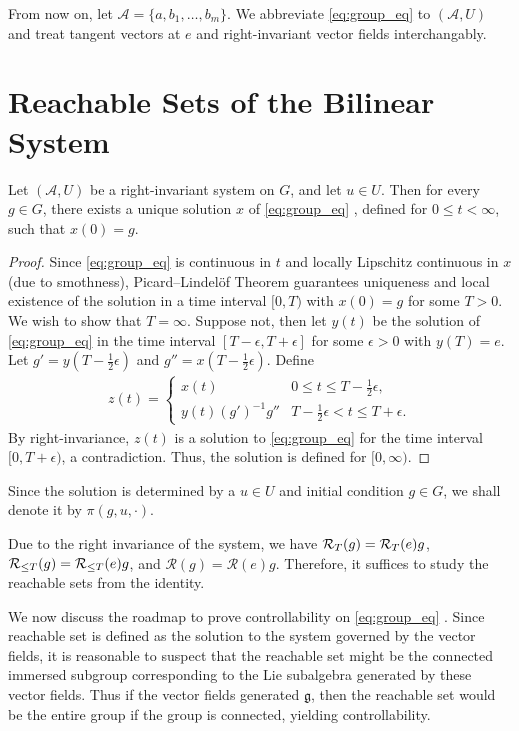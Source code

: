 \documentclass[12pt,class=article,crop=false]{standalone}
\begin{document}
From now on, let $ \mathcal{ A} = \{a,b_1,\ldots,b_m\} $. We abbreviate \cref{eq:group_eq}  to $ ( \mathcal{ A},U)$ and treat tangent vectors at $ e$ and right-invariant vector fields interchangably.

\section{Reachable Sets of the Bilinear System}
\begin{prop}
Let $ ( \mathcal{ A}, U)$ be a right-invariant system on $ G$, and let  $ u \in U$. Then for every $ g \in G$, there exists a unique solution $ x$ of \cref{eq:group_eq} , defined for  $ 0 \leq t < \infty$, such that $ x(0) = g$.
\end{prop}
\begin{proof}
	Since \cref{eq:group_eq}  is continuous in $ t$ and locally Lipschitz continuous in  $ x$ (due to smothness), Picard--Lindel\"{o}f Theorem guarantees uniqueness and local existence of the solution in a time interval $ [0,T)$ with $ x(0) = g$ for some $ T>0$. We wish to show that $ T = \infty$. Suppose not, then let $ y(t)$ be the solution of  \cref{eq:group_eq} in the time interval $ [T- \epsilon, T+ \epsilon]$ for some $ \epsilon > 0$ with $ y(T) = e$. Let $g' = y\left( T- \frac{1}{2} \epsilon \right)$ and $ g''=  x\left( T- \frac{1}{2} \epsilon \right) $. Define
 \begin{align*}
 	z(t) = \begin{cases}
		x(t) & 0 \leq t \leq T - \frac{1}{2} \epsilon , \\
		y(t)(g')^{-1} g'' & T - \frac{1}{2} \epsilon < t \leq T + \epsilon .
 	\end{cases}
 \end{align*}
 By right-invariance, $ z(t)$ is a solution to  \cref{eq:group_eq} for the time interval $ [0, T+ \epsilon)$, a contradiction. Thus, the solution is defined for $ [0, \infty)$. 
\end{proof}
Since the solution is determined by a $ u \in U$ and initial condition $ g \in G$, we shall denote it by $ \pi (g,u, \cdot )$. 

\begin{remark}
Due to the right invariance of the system, we have $ \mathcal{R}_T( g) = \mathcal{R}_T( e) g$, $ \mathcal{R}_{\le T}( g) = \mathcal{R}_{\le T}( e) g$, and $ \mathcal{R}( g) = \mathcal{R}( e) g$. Therefore, it suffices to study the reachable sets from the identity.
\end{remark}

We now discuss the roadmap to prove controllability on \cref{eq:group_eq} . Since reachable set is defined as the solution to the system governed by the vector fields, it is reasonable to suspect that the reachable set might be the connected immersed subgroup corresponding to the Lie subalgebra generated by these vector fields. Thus if the vector fields generated $ \mathfrak{g} $, then the reachable set would be the entire group if the group is connected, yielding controllability.
\end{document}
